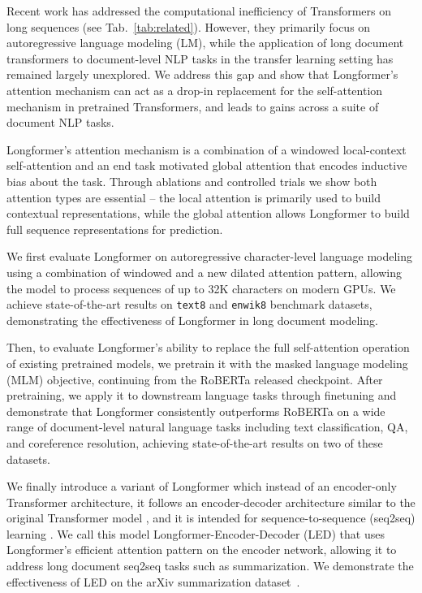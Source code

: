 Recent work has addressed the computational inefficiency of Transformers on long sequences (see Tab.~\ref{tab:related}).
However, they primarily focus on autoregressive language modeling (LM), while the application of long document transformers to document-level NLP tasks in the transfer learning setting \cite{NIPS2015_5949,Peters2018DeepCW,Howard2018UniversalLM,bert} has remained largely unexplored.  We address this gap and show that Longformer's attention mechanism can act as a drop-in replacement for the self-attention mechanism in pretrained Transformers, and leads to gains across a suite of document NLP tasks.

Longformer's attention mechanism is a combination of a windowed local-context self-attention and an end task motivated global attention that encodes inductive bias about the task. Through ablations and controlled trials we show both attention types are essential -- the local attention is primarily used to build contextual representations, while the global attention allows Longformer to build full sequence representations for prediction.

We first evaluate Longformer on autoregressive character-level language modeling using a combination of windowed and a new dilated attention pattern, allowing the model to process sequences of up to 32K characters on modern GPUs. We achieve state-of-the-art results on \texttt{text8} and \texttt{enwik8} benchmark datasets, demonstrating the effectiveness of Longformer in long document modeling. 

Then, to evaluate Longformer's ability to replace the full self-attention operation of existing pretrained models, we pretrain it with the masked language modeling (MLM) objective, continuing from the RoBERTa \cite{roberta} released checkpoint. After pretraining, we apply it to downstream language tasks through finetuning and demonstrate that Longformer consistently outperforms RoBERTa on a wide range of document-level natural language tasks including text classification, QA, and coreference resolution, achieving state-of-the-art results on two of these datasets.

We finally introduce a variant of Longformer which instead of an encoder-only Transformer architecture, it follows an encoder-decoder architecture similar to the original Transformer model \cite{Vaswani2017AttentionIA}, and it is intended for sequence-to-sequence (seq2seq) learning \cite{Sutskever2014SequenceTS}. We call this model Longformer-Encoder-Decoder (LED) that uses Longformer's efficient attention pattern on the encoder network, allowing it to address long document seq2seq tasks such as summarization. We demonstrate the effectiveness of LED on the arXiv summarization dataset~\cite{arxiv2018}.

